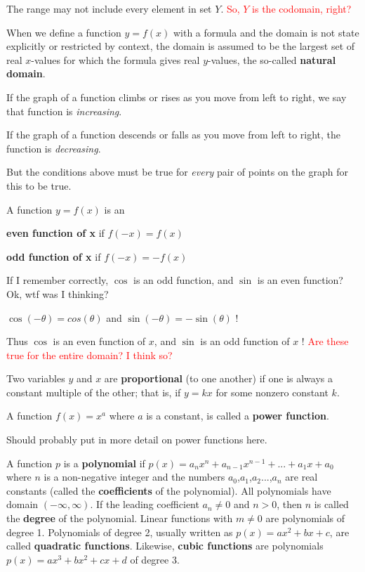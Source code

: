 \documentclass[12pt]{article}
\begin{document}
The range may not include every element in set $Y$. \textcolor{red}{So, $Y$ is the codomain, right?}

When we define a function $y = f(x)$ with a formula and the domain is not state explicitly or restricted by
context, the domain is assumed to be the largest set of real $x$-values for which the formula gives real
$y$-values, the so-called \textbf{natural domain}.

If the graph of a function climbs or rises as you move from left to right, we say that function is
\textit{increasing}.

If the graph of a function descends or falls as you move from left to right, the function is
\textit{decreasing}.

But the conditions above must be true for \textit{every} pair of points on the graph for this to be true.

A function $y = f(x)$ is an

\textbf{even function of x} if $f(-x) = f(x)$

\textbf{odd function of x} if $f(-x) = -f(x)$

If I remember correctly, $\cos$ is an odd function, and $\sin$ is an even function? Ok, wtf was I thinking?

$\cos(-\theta) = cos(\theta)$ and $\sin(-\theta) = -\sin(\theta)$ !

Thus $\cos$ is an even function of $x$, and $\sin$ is an odd function of $x$ ! \textcolor{red}{Are these true
  for the entire domain? I think so?}

Two variables $y$ and $x$ are \textbf{proportional} (to one another) if one is always a constant multiple of
the other; that is, if $y = kx$ for some nonzero constant $k$.

A function $f(x) = x^{a}$ where $a$ is a constant, is called a \textbf{power function}.

Should probably put in more detail on power functions here.

A function $p$ is a \textbf{polynomial} if $p(x) = a_{n}x^{n} + a_{n-1}x^{n-1} + ... + a_{1}x + a_{0}$ where
$n$ is a non-negative integer and the numbers $a_{0}$,$a_{1}$,$a_{2}$...,$a_{n}$ are real constants (called
the \textbf{coefficients} of the polynomial). All polynomials have domain $(-\infty,\infty)$. If the leading
coefficient $a_{n} \neq 0$ and $n > 0$, then $n$ is called the \textbf{degree} of the polynomial. Linear
functions with $m \neq 0$ are polynomials of degree 1. Polynomials of degree 2, usually written as $p(x) =
ax^{2} + bx + c$, are called \textbf{quadratic functions}. Likewise, \textbf{cubic functions} are polynomials
$p(x) = ax^{3} + bx^{2} + cx + d$ of degree 3.
\end{document}

